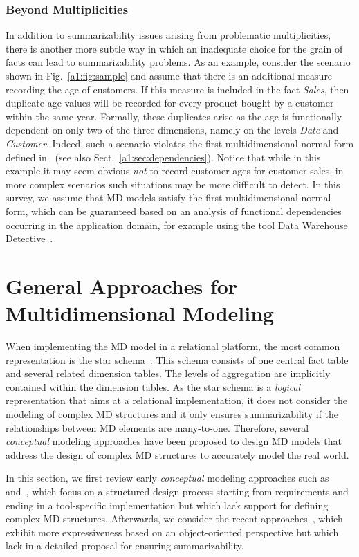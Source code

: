 \subsubsection{Beyond Multiplicities} In addition to summarizability issues arising from problematic multiplicities,
there is another more subtle way in which an inadequate choice for
the grain of facts can lead to summarizability problems.  As an
example, consider the scenario shown in Fig.~\ref{a1:fig:sample} and
assume that there is an additional measure recording the age of
customers.  If this measure is included in the fact \textit{Sales},
then duplicate age values will be recorded for every product bought
by a customer within the same year.  Formally, these duplicates
arise as the age is functionally dependent on only two of the three
dimensions, namely on the levels \textit{Date} and
\textit{Customer}.  Indeed, such a scenario violates the first
multidimensional normal form defined
in~\cite{DBLP:journals/is/LechtenborgerV03} (see also
Sect.~\ref{a1:sec:dependencies}).  Notice that while in this example
it may seem obvious \emph{not} to record customer ages for customer
sales, in more complex scenarios such situations may be more
difficult to detect.  In this survey, we assume that MD models
satisfy the first multidimensional normal form, which can be
guaranteed based on an analysis of functional dependencies occurring
in the application domain, for example using the tool Data Warehouse
Detective~\cite{DBLP:conf/btw/HaselmannLV07}.


\section{General Approaches for Multidimensional Modeling}
\label{a1:sec:general} When implementing the MD model in a
relational platform, the most common representation is the star
sche\-ma~\cite{book/Kimball/DW}. This schema consists of one central
fact table and several related dimension tables. The levels of
aggregation are implicitly contained within the dimension tables. As
the star schema is a \emph{logical} representation that aims at a
relational implementation, it does not consider the modeling of
complex MD structures and it only ensures summarizability if the
relationships between MD elements are many-to-one. Therefore,
several \emph{conceptual} modeling approaches have been proposed to
design MD models that address the design of complex MD structures to
accurately model the real world.

In this section, we first review early \emph{conceptual} modeling
approaches such as~\cite{DBLP:journals/ijcis/GolfarelliMR98}
and~\cite{DBLP:conf/dmdw/HusemannLV00}, which focus on a structured
design process starting from requirements and ending in a
tool-specific implementation but which lack support for defining
complex MD structures. Afterwards, we consider the recent
approaches~\cite{DBLP:journals/is/AbelloSS06,DBLP:journals/dke/Lujan-MoraTS06,DBLP:journals/dss/PratAC06},
which exhibit more expressiveness based on an object-oriented
perspective but which lack in a detailed proposal for ensuring
summarizability.

